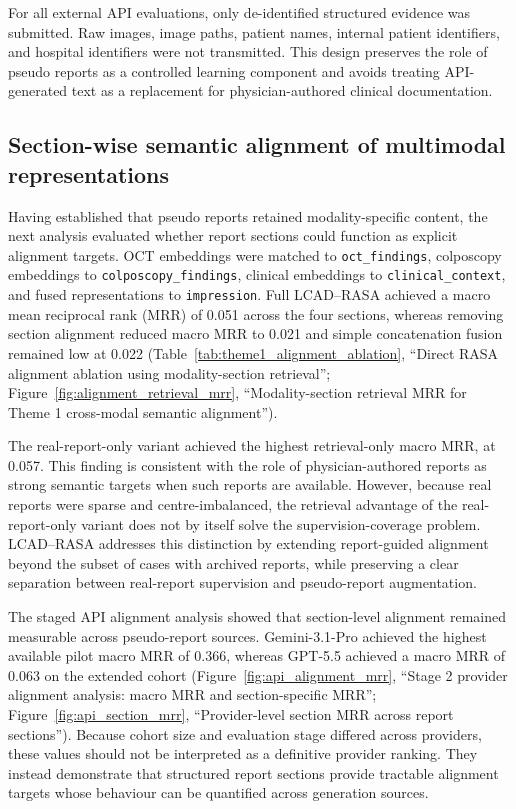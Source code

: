 For all external API evaluations, only de-identified structured evidence was submitted. Raw images, image paths, patient names, internal patient identifiers, and hospital identifiers were not transmitted. This design preserves the role of pseudo reports as a controlled learning component and avoids treating API-generated text as a replacement for physician-authored clinical documentation.

\subsection{Section-wise semantic alignment of multimodal representations}
\label{subsec:alignment_results}

Having established that pseudo reports retained modality-specific content, the next analysis evaluated whether report sections could function as explicit alignment targets. OCT embeddings were matched to \texttt{oct\_findings}, colposcopy embeddings to \texttt{colposcopy\_findings}, clinical embeddings to \texttt{clinical\_context}, and fused representations to \texttt{impression}. Full LCAD--RASA achieved a macro mean reciprocal rank (MRR) of 0.051 across the four sections, whereas removing section alignment reduced macro MRR to 0.021 and simple concatenation fusion remained low at 0.022 (Table~\ref{tab:theme1_alignment_ablation}, ``Direct RASA alignment ablation using modality-section retrieval''; Figure~\ref{fig:alignment_retrieval_mrr}, ``Modality-section retrieval MRR for Theme 1 cross-modal semantic alignment'').

The real-report-only variant achieved the highest retrieval-only macro MRR, at 0.057. This finding is consistent with the role of physician-authored reports as strong semantic targets when such reports are available. However, because real reports were sparse and centre-imbalanced, the retrieval advantage of the real-report-only variant does not by itself solve the supervision-coverage problem. LCAD--RASA addresses this distinction by extending report-guided alignment beyond the subset of cases with archived reports, while preserving a clear separation between real-report supervision and pseudo-report augmentation.

The staged API alignment analysis showed that section-level alignment remained measurable across pseudo-report sources. Gemini-3.1-Pro achieved the highest available pilot macro MRR of 0.366, whereas GPT-5.5 achieved a macro MRR of 0.063 on the extended cohort (Figure~\ref{fig:api_alignment_mrr}, ``Stage 2 provider alignment analysis: macro MRR and section-specific MRR''; Figure~\ref{fig:api_section_mrr}, ``Provider-level section MRR across report sections''). Because cohort size and evaluation stage differed across providers, these values should not be interpreted as a definitive provider ranking. They instead demonstrate that structured report sections provide tractable alignment targets whose behaviour can be quantified across generation sources.

